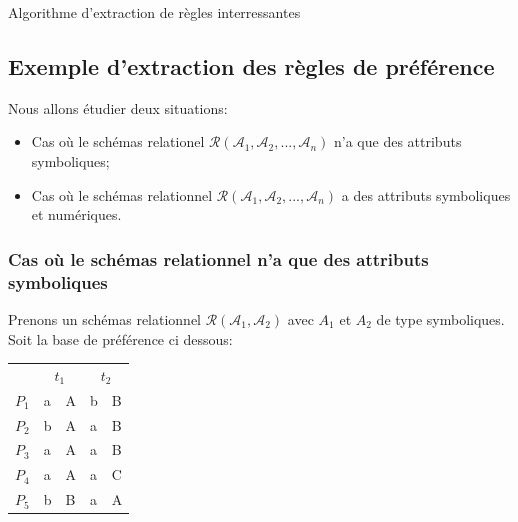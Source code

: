 \documentclass[a4paper,12pt,openany,oneside]{article}
\begin{document}
 \begin{algorithm}[H]
 
 
 	
 	\caption{Algorithme d'extraction de règles interressantes}
 \end{algorithm}
 
 
 
 
 	
 
 
 
    
    
    \subsection{Exemple d'extraction des règles de préférence}
    Nous allons étudier deux situations:
    \begin{itemize}
    		\item Cas où le schémas relationel $\mathcal{R}(\mathcal{A}_{1},\mathcal{A}_{2},...,\mathcal{A}_{n})$ n'a que des attributs symboliques;
    		\item Cas où le schémas relationnel $\mathcal{R}(\mathcal{A}_{1},\mathcal{A}_{2},...,\mathcal{A}_{n})$ a des attributs symboliques et numériques.\\
    \end{itemize}
    
   \subsubsection{ Cas où le schémas relationnel  n'a que des attributs symboliques}
      Prenons un schémas relationnel $\mathcal{R}(\mathcal{A}_{1},\mathcal{A}_{2})$ avec $A_{1}$ et $A_{2}$ de type symboliques. Soit la base de préférence ci dessous:
      \begin{center}
      \begin{tabular}{l|l|l|l|l| } 
      
       &\multicolumn{2}{c|}{$t_{1}$} & \multicolumn{2}{c|}{$t_{2}$}\\
      \cline{2-5}
   		$P_{1}$ & a & A & b & B\\
   		$P_{2}$ & b & A & a & B\\
   		$P_{3}$ & a & A & a & B\\
   		$P_{4}$ & a & A & a & C\\
   		$P_{5}$ & b & B & a & A\\
   	\cline{2-5}
      \end{tabular}
      \end{center}   
      
\end{document}
